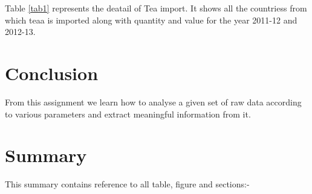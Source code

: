 \documentclass[a4paper,11pt]{article}
\begin{document}
Table \ref{tab1} represents the deatail of Tea import. It shows all the countriess from which teaa is imported along with quantity and value for the year 2011-12 and 2012-13.

\section{Conclusion}			%
\label{sec:con}
From this assignment we learn how to analyse a given set of raw data according to various parameters and extract meaningful information from it.

\section{Summary}				%
\label{sec:sum}
This summary contains reference to all table, figure and sections:-
\end{document}
